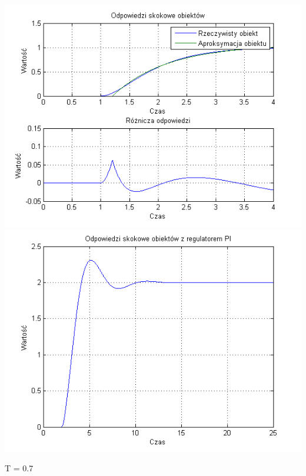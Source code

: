 \documentclass[10pt,a4paper]{article}
\begin{document}
\begin{center}
\includegraphics[scale=1]{images/jeden/skrypt_55.png}\\
\includegraphics[scale=1]{images/jeden/skrypt_56.png}\\
\end{center}
\newpage
T = 0.7
\end{document}
